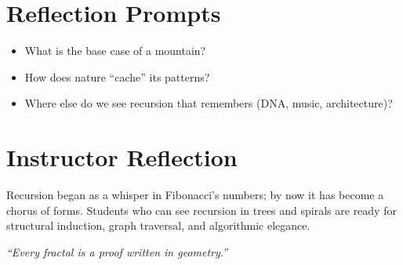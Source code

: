\section{Reflection Prompts}
\begin{itemize}
  \item What is the base case of a mountain?
  \item How does nature “cache” its patterns?
  \item Where else do we see recursion that remembers (DNA, music, architecture)?
\end{itemize}

\section{Instructor Reflection}
Recursion began as a whisper in Fibonacci’s numbers;
by now it has become a chorus of forms.  
Students who can see recursion in trees and spirals are ready for structural induction,
graph traversal, and algorithmic elegance.

\begin{center}
\emph{“Every fractal is a proof written in geometry.”}
\end{center}

